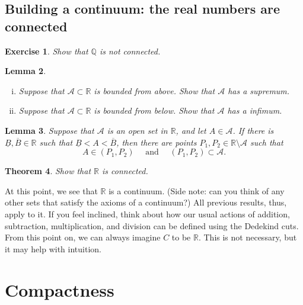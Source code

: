\documentclass{amsart}
\newtheorem{theorem}{Theorem}
\newtheorem{lemma}[theorem]{Lemma}
\newtheorem{exercise}[theorem]{Exercise}
\newcommand{\Q}{\mathbb Q}
\newcommand{\R}{\mathbb R}
\newcommand{\1}{\mathds{1}}
\newcommand{\cA}{\mathcal A}
\newcommand{\cB}{\mathcal B}
\def \R {{\mathbb {R}}}
\numberwithin{equation}{section}
\numberwithin{theorem}{section}
\begin{document}
\subsection{Building a continuum: the real numbers are connected}

\begin{exercise}
	Show that $\Q$ is not connected.
\end{exercise}



%	
\begin{lemma}
	\begin{enumerate}[(i)]
		\item Suppose that $\cA \subset \R$ is bounded from above.  Show that $\cA$ has a supremum.
		\item Suppose that $\cA \subset \R$ is bounded from below.  Show that $\cA$ has a infimum.
	\end{enumerate}
\end{lemma}


\begin{lemma}
Suppose that $\cA$ is an open set in $\R$, and let $A \in \cA$.  If there is $\underline B, \overline B \in \R$ such that $\underline B < A < \overline B$, then there are points $P_1, P_2 \in \R\setminus \cA$ such that
\[
	A \in (P_1, P_2)
		\quad\text{ and }\quad
	(P_1, P_2) \subset \cA.
\]
\end{lemma}




\begin{theorem}
	Show that $\R$ is connected.
\end{theorem}




At this point, we see that $\R$ is a continuum.  (Side note: can you think of any other sets that satisfy the axioms of a continuum?)  All previous results, thus, apply to it.  If you feel inclined, think about how our usual actions of addition, subtraction, multiplication, and division can be defined using the Dedekind cuts.  From this point on, we can always imagine $C$ to be $\R$.  This is not necessary, but it may help with intuition.










\section{Compactness}
\end{document}
